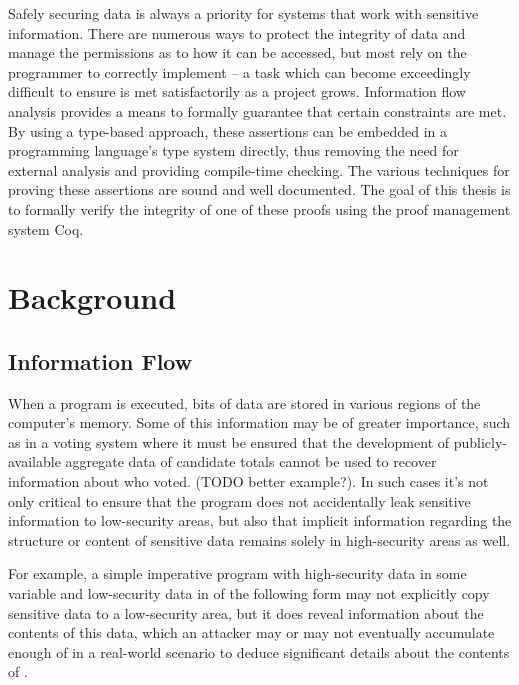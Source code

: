 \documentclass[12pt]{report}
\begin{document}
 Safely securing data is always a priority for systems that work
with sensitive information. There are numerous ways to protect the
integrity of data and manage the permissions as to how it can be
accessed, but most rely on the programmer to correctly implement
– a task which can become exceedingly difficult to ensure is met
satisfactorily as a project grows. Information flow analysis provides
a means to formally guarantee that certain constraints are met. By
using a type-based approach, these assertions can be embedded in
a programming language's type system directly, thus removing the need
for external analysis and providing compile-time checking. The
various techniques for proving these assertions are sound and well
documented. The goal of this thesis is to formally verify the
integrity of one of these proofs using the proof management system
Coq. 

\section{Background}



\subsection{Information Flow}



 When a program is executed, bits of data are stored in various
regions of the computer's memory. Some of this information may be of
greater importance, such as in a voting system where it must be
ensured that the development of publicly-available aggregate data of
candidate totals cannot be used to recover information about who
voted. (TODO better example?).  In such cases it's not only critical
to ensure that the program does not accidentally leak sensitive
information to low-security areas, but also that implicit information
regarding the structure or content of sensitive data remains solely
in high-security areas as well.


For example, a simple imperative program with high-security data in
some variable  and low-security data in  of the following form
may not explicitly copy sensitive data to a low-security area, but it
does reveal information about the contents of this data, which an
attacker may or may not eventually accumulate enough of in
a real-world scenario to deduce significant details about the
contents of .
\end{document}
